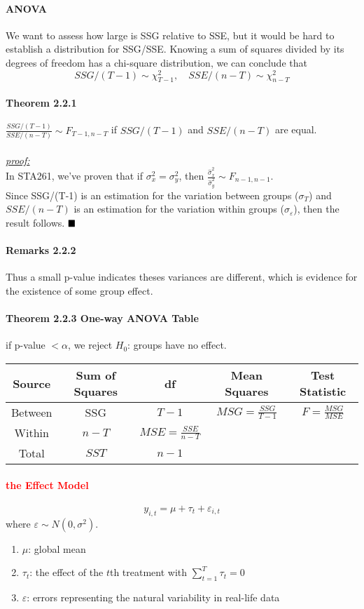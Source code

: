 \documentclass[11pt]{article}
\newcommand{\proof}[0]{\textit{\underline{proof:} }}
\newcommand{\qed}[0]{$\hfill\blacksquare$}
\begin{document}
\paragraph{ANOVA}
We want to assess how large is SSG relative to SSE, but it would be hard to establish a distribution for SSG/SSE. Knowing a sum of squares divided by its degrees of freedom has a chi-square distribution, we can conclude that
$$SSG/(T-1) \sim \chi_{T-1}^2, \quad SSE/(n-T) \sim \chi_{n-T}^2$$
\paragraph{Theorem 2.2.1} $\frac{SSG/(T-1)}{SSE/(n-T)} \sim F_{T-1, n-T}$ if $SSG/(T-1)$ and $SSE/(n-T)$ are equal. \\\\
\proof \\
In STA261, we've proven that if $\sigma_x^2 = \sigma_y^2$, then $\frac{\hat{\sigma}_x^2}{\hat{\sigma}_y^2} \sim F_{n-1,n-1}$.\\ Since SSG/(T-1) is an estimation for the variation between groups ($\sigma_T$) and $SSE/(n-T)$ is an estimation for the variation within groups ($\sigma_\varepsilon$), then the result follows. \qed
\paragraph{Remarks 2.2.2} Thus a small p-value indicates theses variances are different, which is evidence for the existence of some group effect.
\paragraph{Theorem 2.2.3 One-way ANOVA Table} if p-value $< \alpha$, we reject $H_0$: groups have no effect. \\
	\begin{tabular}{|c|c|c|c|c|}
		\hline
		Source & Sum of Squares & df & Mean Squares & Test Statistic \\
		\hline
		Between & SSG & $T-1$ & $MSG = \frac{SSG}{T-1}$ & $F = \frac{MSG}{MSE}$ \\
		\hline
		Within & $n - T$ & $MSE = \frac{SSE}{n - T}$ &&\\
		\hline
		Total & $SST$ & $ n -1$ &&\\
		\hline
	\end{tabular}
\paragraph{\textcolor{red}{the Effect Model}}
$$y_{i,t} = \mu + \tau_t + \varepsilon_{i,t}$$
where $\varepsilon \sim N(0, \sigma^2)$.
\begin{enumerate}
	\item $\mu$: global mean
	\item $\tau_t$: the effect of the $t$th treatment with $\sum_{t=1}^T \tau_t = 0$
	\item $\varepsilon$: errors representing the natural variability in real-life data
\end{enumerate}
\end{document}
